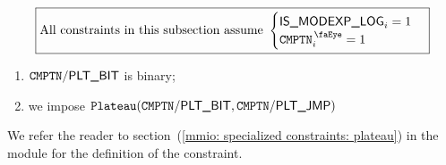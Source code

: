 \[
    \boxed{\text{All constraints in this subsection assume }
        \begin{cases}
            \isModexpLog   _{i} = 1 \\
            \isComputation _{i} = 1   \\
        \end{cases}}
\]
\begin{enumerate}
    \item $\texttt{CMPTN}\textsf{/}{\textsf{PLT\_BIT}}$ is binary;
    \item we impose $\texttt{Plateau}( \texttt{CMPTN}\textsf{/}{\textsf{PLT\_BIT}}, \texttt{CMPTN}\textsf{/}{\textsf{PLT\_JMP}})$
\end{enumerate}
We refer the reader to section~(\ref{mmio: specialized constraints: plateau}) in the \mmioMod{} module for the definition of the \plateau{} constraint.
